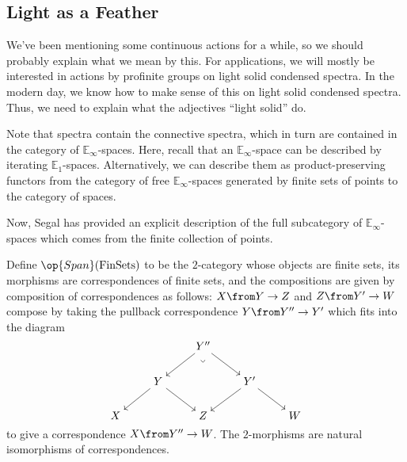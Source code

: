 \documentclass[../notes.tex]{subfiles}
\begin{document}
\subsection{Light as a Feather}
We've been mentioning some continuous actions for a while, so we should probably explain what we mean by this. For applications, we will mostly be interested in actions by profinite groups on light solid condensed spectra. In the modern day, we know how to make sense of this on light solid condensed spectra. Thus, we need to explain what the adjectives ``light solid'' do.
\begin{remark}
	Note that spectra contain the connective spectra, which in turn are contained in the category of $\mathbb E_\infty$-spaces. Here, recall that an $\mathbb E_\infty$-space can be described by iterating $\mathbb E_1$-spaces. Alternatively, we can describe them as product-preserving functors from the category of free $\mathbb E_\infty$-spaces generated by finite sets of points to the category of spaces.
\end{remark}
Now, Segal has provided an explicit description of the full subcategory of $\mathbb E_\infty$-spaces which comes from the finite collection of points.
\begin{definition}[spans]
	Define $\op{Span}(\mathrm{FinSets})$ to be the $2$-category whose objects are finite sets, its morphisms are correspondences of finite sets, and the compositions are given by composition of correspondences as follows: $X\from Y\to Z$ and $Z\from Y'\to W$ compose by taking the pullback correspondence $Y\from Y''\to Y'$ which fits into the diagram
	\[\begin{tikzcd}[cramped]
		&& {Y''} && \\
		& Y && {Y'} \\
		X && Z && W
		\arrow[from=1-3, to=2-2]
		\arrow[from=1-3, to=2-4]
		\arrow["\lrcorner"{anchor=center, pos=0.125, rotate=-45}, draw=none, from=1-3, to=3-3]
		\arrow[from=2-2, to=3-1]
		\arrow[from=2-2, to=3-3]
		\arrow[from=2-4, to=3-3]
		\arrow[from=2-4, to=3-5]
	\end{tikzcd}\]
	to give a correspondence $X\from Y''\to W$. The $2$-morphisms are natural isomorphisms of correspondences.
\end{definition}
\end{document}
